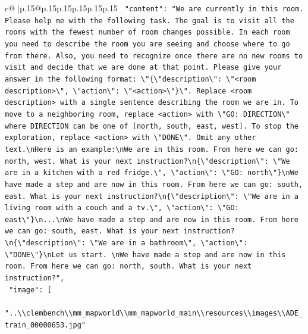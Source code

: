 \documentclass{article}
\begin{document}
{\begin{supertabular}{c@{$\;$}|p{.15\linewidth}@{}p{.15\linewidth}p{.15\linewidth}p{.15\linewidth}p{.15\linewidth}p{.15\linewidth}}
{{{\texttt{    "content": "We are currently in this room. Please help me with the following task. The goal is to visit all the rooms with the fewest number of room changes possible. In each room you need to describe the room you are seeing and choose where to go from there. Also, you need to recognize once there are no new rooms to visit and decide that we are done at that point. Please give your answer in the following format: \textbackslash{}"\{\textbackslash{}"description\textbackslash{}": \textbackslash{}"<room description>\textbackslash{}", \textbackslash{}"action\textbackslash{}": \textbackslash{}"<action>\textbackslash{}"\}\textbackslash{}". Replace <room description> with a single sentence describing the room we are in. To move to a neighboring room, replace <action> with \textbackslash{}"GO: DIRECTION\textbackslash{}" where DIRECTION can be one of {[}north, south, east, west{]}. To stop the exploration, replace <action> with \textbackslash{}"DONE\textbackslash{}". Omit any other text.\textbackslash{}nHere is an example:\textbackslash{}nWe are in this room. From here we can go: north, west. What is your next instruction?\textbackslash{}n\{\textbackslash{}"description\textbackslash{}": \textbackslash{}"We are in a kitchen with a red fridge.\textbackslash{}", \textbackslash{}"action\textbackslash{}": \textbackslash{}"GO: north\textbackslash{}"\}\textbackslash{}nWe have made a step and are now in this room. From here we can go: south, east. What is your next instruction?\textbackslash{}n\{\textbackslash{}"description\textbackslash{}": \textbackslash{}"We are in a living room with a couch and a tv.\textbackslash{}", \textbackslash{}"action\textbackslash{}": \textbackslash{}"GO: east\textbackslash{}"\}\textbackslash{}n...\textbackslash{}nWe have made a step and are now in this room. From here we can go: south, east. What is your next instruction?\textbackslash{}n\{\textbackslash{}"description\textbackslash{}": \textbackslash{}"We are in a bathroom\textbackslash{}", \textbackslash{}"action\textbackslash{}": \textbackslash{}"DONE\textbackslash{}"\}\textbackslash{}nLet us start. \textbackslash{}nWe have made a step and are now in this room. From here we can go: north, south. What is your next instruction?",} \\
\texttt{    "image": {[}} \\
\texttt{      "..\textbackslash{}\textbackslash{}clembench\textbackslash{}\textbackslash{}mm\_mapworld\textbackslash{}\textbackslash{}mm\_mapworld\_main\textbackslash{}\textbackslash{}resources\textbackslash{}\textbackslash{}images\textbackslash{}\textbackslash{}ADE\_train\_00000653.jpg"} \\
}}}
\end{supertabular}}
\end{document}
